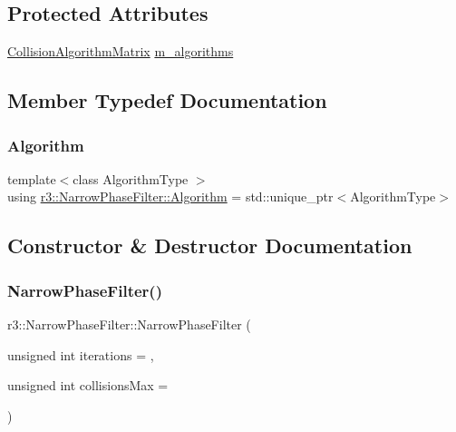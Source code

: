 \subsection*{Protected Attributes}
\begin{DoxyCompactItemize}
\item 
\mbox{\hyperlink{classr3_1_1_collision_algorithm_matrix}{Collision\+Algorithm\+Matrix}} \mbox{\hyperlink{classr3_1_1_narrow_phase_filter_a476cf750e3cd55d9e36a011eb0c447af}{m\+\_\+algorithms}}
\end{DoxyCompactItemize}


\subsection{Member Typedef Documentation}
\mbox{\label{classr3_1_1_narrow_phase_filter_aebe310c944167ad73abf098ccc68ed88}} 
\subsubsection{\texorpdfstring{Algorithm}{Algorithm}}
{\footnotesize\ttfamily template$<$class Algorithm\+Type $>$ \\
using \mbox{\hyperlink{classr3_1_1_narrow_phase_filter_aebe310c944167ad73abf098ccc68ed88}{r3\+::\+Narrow\+Phase\+Filter\+::\+Algorithm}} =  std\+::unique\+\_\+ptr$<$Algorithm\+Type$>$}



\subsection{Constructor \& Destructor Documentation}
\mbox{\label{classr3_1_1_narrow_phase_filter_ad3696d7d4a1d0cfd1b383802a4504897}} 
\subsubsection{\texorpdfstring{Narrow\+Phase\+Filter()}{NarrowPhaseFilter()}}
{\footnotesize\ttfamily r3\+::\+Narrow\+Phase\+Filter\+::\+Narrow\+Phase\+Filter (\begin{DoxyParamCaption}\item[{unsigned int}]{iterations = {},  }\item[{unsigned int}]{collisions\+Max = {} }\end{DoxyParamCaption})\hspace{0.3cm}{\ttfamily [explicit]}}

